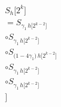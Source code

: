 \documentclass[preview]{standalone}
\begin{document}
\begin{center}
\begin{align*}S_{h}\!\big[2^{k}\big] \\= S_{\gamma_{1}\, h\!\big[2^{k-2}\big]} \\\circ S_{\gamma_{1}\, h\!\big[2^{k-2}\big]} \\\circ S_{\big(1 - 4\gamma_{1}\big)\, h\!\big[2^{k-2}\big]} \\\circ S_{\gamma_{1}\, h\!\big[2^{k-2}\big]} \\\circ S_{\gamma_{1}\, h\!\big[2^{k-2}\big]} \\\big]\end{align*}
\end{center}
\end{document}
